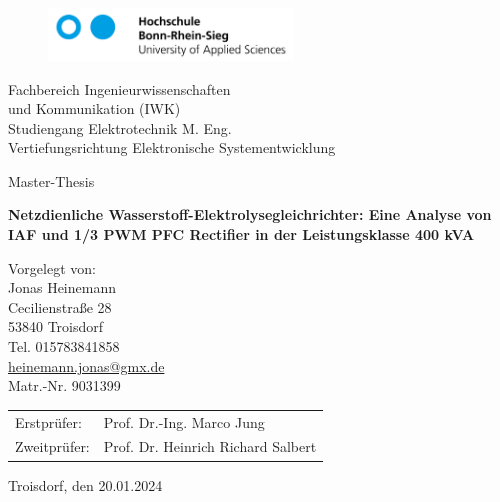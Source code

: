 \begin{titlepage}
	\setlength{\parindent}{0pt}%
	\begin{figure}
		\includegraphics[height=1.4cm]{content/Grafiken/H-BRS_Logo}
		\hfill
		
	\end{figure}
	\vspace{1cm}
	\begin{onehalfspace}
		 Fachbereich Ingenieurwissenschaften\\
		 und Kommunikation (IWK)\\
		Studiengang Elektrotechnik M. Eng.\\
		Vertiefungsrichtung Elektronische Systementwicklung 
		\vspace{2cm}
		\begin{center}
			\begin{singlespacing}
				{\large\textsf{Master-Thesis}\par}
				\vspace{1mm}
				{\huge\textbf{\textsf{
					Netzdienliche Wasserstoff-Elektrolysegleichrichter: Eine Analyse von IAF und 1/3 PWM PFC Rectifier in der Leistungsklasse 400 kVA
				}}\par}
			\end{singlespacing}
		\end{center}
		\vfill
		Vorgelegt von:\\
		Jonas Heinemann\\
		Cecilienstraße 28\\
		53840 Troisdorf\\
		Tel. 015783841858\\
		\href{mailto:heinemann.jonas@gmx.de}{heinemann.jonas@gmx.de}\\
		Matr.-Nr. 9031399
		\begin{table}
			\begin{tabular}{@{}ll}
				Erstprüfer:  & Prof. Dr.-Ing. Marco Jung\\
				Zweitprüfer: & Prof. Dr. Heinrich Richard Salbert\\
			\end{tabular}
		\end{table}
	\end{onehalfspace}
	Troisdorf, den 20.01.2024
\end{titlepage}
